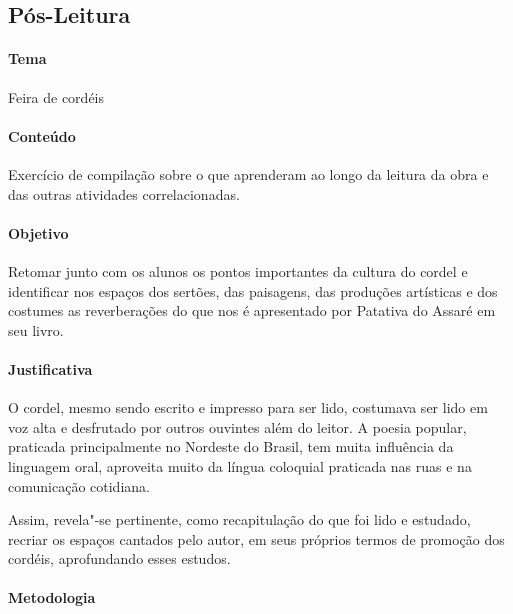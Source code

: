 \documentclass[12pt]{extarticle}
\begin{document}
\subsection{Pós-Leitura}

\paragraph{Tema} Feira de cordéis

\paragraph{Conteúdo} Exercício de compilação sobre o que aprenderam ao longo da leitura da obra e das outras 
atividades correlacionadas. 

\paragraph{Objetivo} Retomar junto com os alunos os pontos importantes da cultura do cordel e identificar 
nos espaços dos sertões, das paisagens, das produções artísticas e dos costumes as reverberações do que nos 
é apresentado por Patativa do Assaré em seu livro. 

\paragraph{Justificativa} O cordel, mesmo sendo escrito e impresso para ser lido, costumava
ser lido em voz alta e desfrutado por outros ouvintes
além do leitor. A poesia popular, praticada principalmente
no Nordeste do Brasil, tem muita influência da linguagem
oral, aproveita muito da língua coloquial praticada nas ruas
e na comunicação cotidiana.

Assim, revela"-se pertinente, como recapitulação do que foi lido e estudado, recriar os espaços 
cantados pelo autor, em seus próprios termos de promoção dos cordéis, aprofundando esses estudos.

\paragraph{Metodologia}
\end{document}
